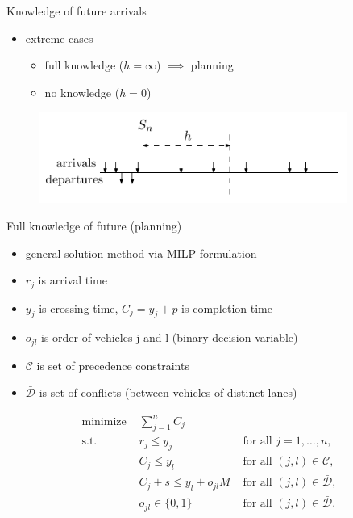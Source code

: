 \documentclass[bigger]{beamer}
\begin{document}
\begin{frame}[label={sec:orgb013001}]{Knowledge of future arrivals}
\begin{itemize}
\item extreme cases
\begin{itemize}
\item full knowledge (\(h=\infty\)) \(\implies\) planning
\item no knowledge (\(h=0\))
\end{itemize}
\end{itemize}

\vfill
\begin{figure}[t]
  \centering
  \includegraphics[width=0.9\textwidth]{../figures/horizon.pdf}
\end{figure}
\end{frame}
\begin{frame}[label={sec:org57a12fe}]{Full knowledge of future (planning)}
\begin{itemize}
\item general solution method via MILP formulation
\item \(r_j\) is arrival time
\item \(y_j\) is crossing time, \(C_j = y_j + p\) is completion time
\item \(o_{jl}\) is order of vehicles j and l (binary decision variable)
\item \(\mathcal{C}\) is set of precedence constraints
\item \(\bar{\mathcal{D}}\) is set of conflicts (between vehicles of distinct lanes)
\end{itemize}

\begin{subequations}
\begin{align}
  \text{minimize } & \sum_{j=1}^{n} C_{j} & \\
  \text{s.t. } & r_{j} \leq y_{j} & \text{ for all } j=1, \dots, n, \\
              & C_{j} \leq y_{l} & \text{ for all } (j,l) \in \mathcal{C}, \\
              & C_{j} + s \leq y_{l} + o_{jl}M  & \text{ for all } (j,l) \in \bar{\mathcal{D}}, \label{eq:disjunctive-constraints} \\
              & o_{jl} \in \{ 0, 1 \} & \text{ for all } (j,l) \in \bar{\mathcal{D}} .
\end{align}
\end{subequations}
\end{frame}
\end{document}
